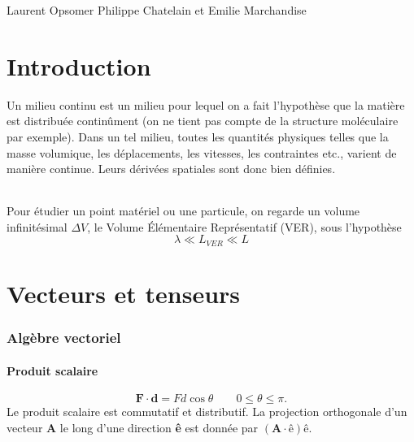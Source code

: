 

\usepackage{graphicx}

\newcommand\fv[1]{\textbf{#1}} %
\newcommand\vp[2]{#1 \wedge #2} %
\renewcommand\sp[2]{#1 \cdot #2} %
\newcommand\rot[1]{\vp{\grad{}}{#1}} %
\renewcommand\div[1]{\sp{\grad{}}{#1}} %

\DeclareMathOperator{\trace}{tr}
\DeclareMathOperator{\cof}{cof}
\DeclareMathOperator{\mydiv}{div}
\DeclareMathOperator{\mygrad}{grad}
\DeclareMathOperator{\myrot}{rot}

{Laurent Opsomer}
{Philippe Chatelain et Emilie Marchandise}

\part*{Introduction}
Un milieu continu est un milieu pour lequel on a fait l'hypothèse que la matière est distribuée continûment (on ne tient pas compte de la structure moléculaire par exemple). Dans un tel milieu, toutes les quantités physiques telles que la masse volumique, les déplacements, les vitesses, les contraintes etc., varient de manière continue. Leurs dérivées spatiales sont donc bien définies.
\paragraph{}
Pour étudier un point matériel ou une particule, on regarde un volume infinitésimal $\Delta V$, le Volume \'Elémentaire Représentatif (VER), sous l'hypothèse $$\lambda \ll L_{VER} \ll L$$

\part{Vecteurs et tenseurs}
\section{Algèbre vectoriel}
\subsection{Produit scalaire}

\[ \sp{\fv{F}}{\fv{d}} = Fd\cos\theta \qquad 0\leq \theta \leq \pi. \]
Le produit scalaire est commutatif et distributif. La projection orthogonale d'un vecteur \fv{A} le long d'une direction \fv{ê} est donnée par
$(\sp{\fv{A}}{\fv{ê}})\fv{ê}$.


